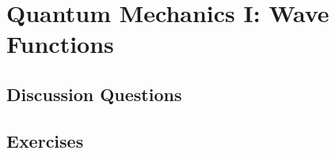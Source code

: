 
\chapter{Quantum Mechanics I: Wave Functions}

\section{Discussion Questions}

\section{Exercises}
